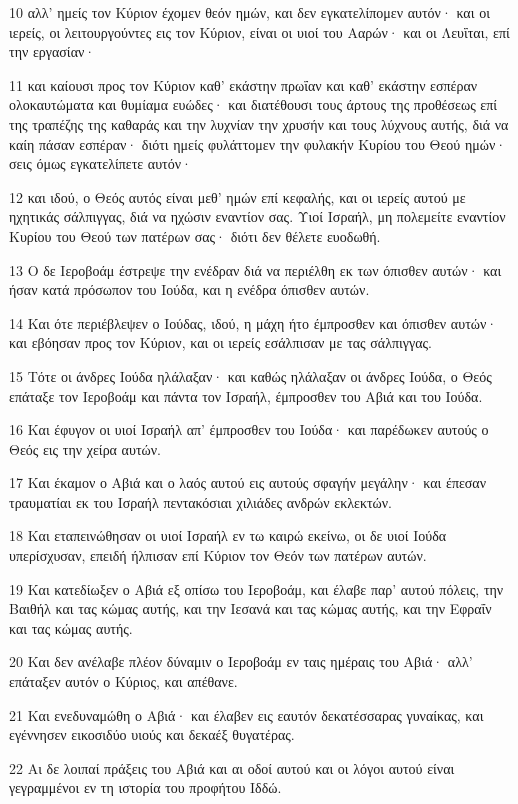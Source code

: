 \par 10 αλλ' ημείς τον Κύριον έχομεν θεόν ημών, και δεν εγκατελίπομεν αυτόν· και οι ιερείς, οι λειτουργούντες εις τον Κύριον, είναι οι υιοί του Ααρών· και οι Λευΐται, επί την εργασίαν·
\par 11 και καίουσι προς τον Κύριον καθ' εκάστην πρωΐαν και καθ' εκάστην εσπέραν ολοκαυτώματα και θυμίαμα ευώδες· και διατέθουσι τους άρτους της προθέσεως επί της τραπέζης της καθαράς και την λυχνίαν την χρυσήν και τους λύχνους αυτής, διά να καίη πάσαν εσπέραν· διότι ημείς φυλάττομεν την φυλακήν Κυρίου του Θεού ημών· σεις όμως εγκατελίπετε αυτόν·
\par 12 και ιδού, ο Θεός αυτός είναι μεθ' ημών επί κεφαλής, και οι ιερείς αυτού με ηχητικάς σάλπιγγας, διά να ηχώσιν εναντίον σας. Υιοί Ισραήλ, μη πολεμείτε εναντίον Κυρίου του Θεού των πατέρων σας· διότι δεν θέλετε ευοδωθή.
\par 13 Ο δε Ιεροβοάμ έστρεψε την ενέδραν διά να περιέλθη εκ των όπισθεν αυτών· και ήσαν κατά πρόσωπον του Ιούδα, και η ενέδρα όπισθεν αυτών.
\par 14 Και ότε περιέβλεψεν ο Ιούδας, ιδού, η μάχη ήτο έμπροσθεν και όπισθεν αυτών· και εβόησαν προς τον Κύριον, και οι ιερείς εσάλπισαν με τας σάλπιγγας.
\par 15 Τότε οι άνδρες Ιούδα ηλάλαξαν· και καθώς ηλάλαξαν οι άνδρες Ιούδα, ο Θεός επάταξε τον Ιεροβοάμ και πάντα τον Ισραήλ, έμπροσθεν του Αβιά και του Ιούδα.
\par 16 Και έφυγον οι υιοί Ισραήλ απ' έμπροσθεν του Ιούδα· και παρέδωκεν αυτούς ο Θεός εις την χείρα αυτών.
\par 17 Και έκαμον ο Αβιά και ο λαός αυτού εις αυτούς σφαγήν μεγάλην· και έπεσαν τραυματίαι εκ του Ισραήλ πεντακόσιαι χιλιάδες ανδρών εκλεκτών.
\par 18 Και εταπεινώθησαν οι υιοί Ισραήλ εν τω καιρώ εκείνω, οι δε υιοί Ιούδα υπερίσχυσαν, επειδή ήλπισαν επί Κύριον τον Θεόν των πατέρων αυτών.
\par 19 Και κατεδίωξεν ο Αβιά εξ οπίσω του Ιεροβοάμ, και έλαβε παρ' αυτού πόλεις, την Βαιθήλ και τας κώμας αυτής, και την Ιεσανά και τας κώμας αυτής, και την Εφραΐν και τας κώμας αυτής.
\par 20 Και δεν ανέλαβε πλέον δύναμιν ο Ιεροβοάμ εν ταις ημέραις του Αβιά· αλλ' επάταξεν αυτόν ο Κύριος, και απέθανε.
\par 21 Και ενεδυναμώθη ο Αβιά· και έλαβεν εις εαυτόν δεκατέσσαρας γυναίκας, και εγέννησεν εικοσιδύο υιούς και δεκαέξ θυγατέρας.
\par 22 Αι δε λοιπαί πράξεις του Αβιά και αι οδοί αυτού και οι λόγοι αυτού είναι γεγραμμένοι εν τη ιστορία του προφήτου Ιδδώ.

